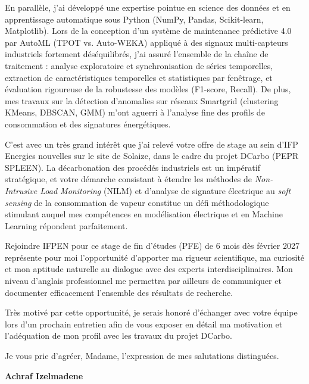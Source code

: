 \documentclass[10pt,a4paper]{altacv}
\begin{document}
\vspace{5pt}

En parallèle, j'ai développé une expertise pointue en science des données et en apprentissage automatique sous Python (NumPy, Pandas, Scikit-learn, Matplotlib). Lors de la conception d'un système de maintenance prédictive 4.0 par AutoML (TPOT vs. Auto-WEKA) appliqué à des signaux multi-capteurs industriels fortement déséquilibrés, j'ai assuré l'ensemble de la chaîne de traitement : analyse exploratoire et synchronisation de séries temporelles, extraction de caractéristiques temporelles et statistiques par fenêtrage, et évaluation rigoureuse de la robustesse des modèles (F1-score, Recall). De plus, mes travaux sur la détection d'anomalies sur réseaux Smartgrid (clustering KMeans, DBSCAN, GMM) m'ont aguerri à l'analyse fine des profils de consommation et des signatures énergétiques.

\vspace{5pt}

C'est avec un très grand intérêt que j'ai relevé votre offre de stage au sein d'IFP Energies nouvelles sur le site de Solaize, dans le cadre du projet DCarbo (PEPR SPLEEN). La décarbonation des procédés industriels est un impératif stratégique, et votre démarche consistant à étendre les méthodes de \textit{Non-Intrusive Load Monitoring} (NILM) et d'analyse de signature électrique au \textit{soft sensing} de la consommation de vapeur constitue un défi méthodologique stimulant auquel mes compétences en modélisation électrique et en Machine Learning répondent parfaitement.

\vspace{5pt}

Rejoindre IFPEN pour ce stage de fin d'études (PFE) de 6 mois dès février 2027 représente pour moi l'opportunité d'apporter ma rigueur scientifique, ma curiosité et mon aptitude naturelle au dialogue avec des experts interdisciplinaires. Mon niveau d'anglais professionnel me permettra par ailleurs de communiquer et documenter efficacement l'ensemble des résultats de recherche. 

\vspace{5pt}

Très motivé par cette opportunité, je serais honoré d'échanger avec votre équipe lors d'un prochain entretien afin de vous exposer en détail ma motivation et l'adéquation de mon profil avec les travaux du projet DCarbo.

\vspace{6pt}

Je vous prie d'agréer, Madame, l'expression de mes salutations distinguées.

\vspace{12pt}

\begin{flushright}
  \large\color{emphasis}\textbf{Achraf Izelmadene}
\end{flushright}
\end{document}
